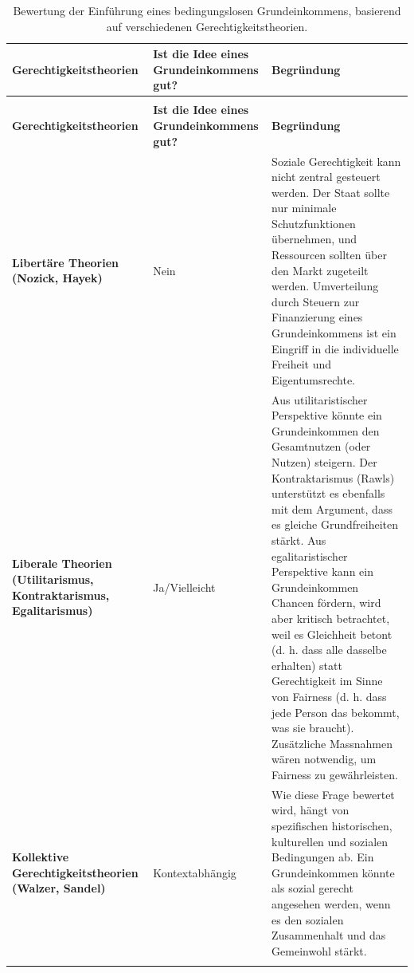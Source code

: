 \documentclass[
  nswissgerman,
  a4paper,
  DIV=11,
  numbers=noendperiod,
  oneside,
  openany]{scrreprt}
\begin{document}
\begin{longtable}[t]{>{\raggedright\arraybackslash}p{3.2cm}>{\raggedright\arraybackslash}p{2.5cm}>{\raggedright\arraybackslash}p{9.3cm}}

\caption{\label{tbl-basic-income-justice}Bewertung der Einführung eines
bedingungslosen Grundeinkommens, basierend auf verschiedenen
Gerechtigkeitstheorien.}

\tabularnewline

\toprule
\textbf{Gerechtigkeitstheorien} & \textbf{Ist die Idee eines Grundeinkommens gut?} & \textbf{Begründung}\\
\midrule
\endfirsthead
\multicolumn{3}{@{}l}{\textit{(continued)}}\\
\toprule
\textbf{Gerechtigkeitstheorien} & \textbf{Ist die Idee eines Grundeinkommens gut?} & \textbf{Begründung}\\
\midrule
\endhead

\endfoot
\bottomrule
\endlastfoot
\textbf{Libertäre Theorien (Nozick, Hayek)} & Nein & Soziale Gerechtigkeit kann nicht zentral gesteuert werden. Der Staat sollte nur minimale Schutzfunktionen übernehmen, und Ressourcen sollten über den Markt zugeteilt werden. Umverteilung durch Steuern zur Finanzierung eines Grundeinkommens ist ein Eingriff in die individuelle Freiheit und Eigentumsrechte.\\
\textbf{Liberale Theorien (Utilitarismus, Kontraktarismus, Egalitarismus)} & Ja/Vielleicht & Aus utilitaristischer Perspektive könnte ein Grundeinkommen den Gesamtnutzen (oder Nutzen) steigern. Der Kontraktarismus (Rawls) unterstützt es ebenfalls mit dem Argument, dass es gleiche Grundfreiheiten stärkt. Aus egalitaristischer Perspektive kann ein Grundeinkommen Chancen fördern, wird aber kritisch betrachtet, weil es Gleichheit betont (d. h. dass alle dasselbe erhalten) statt Gerechtigkeit im Sinne von Fairness (d. h. dass jede Person das bekommt, was sie braucht). Zusätzliche Massnahmen wären notwendig, um Fairness zu gewährleisten.\\
\textbf{Kollektive Gerechtigkeitstheorien (Walzer, Sandel)} & Kontextabhängig & Wie diese Frage bewertet wird, hängt von spezifischen historischen, kulturellen und sozialen Bedingungen ab. Ein Grundeinkommen könnte als sozial gerecht angesehen werden, wenn es den sozialen Zusammenhalt und das Gemeinwohl stärkt.\\*

\end{longtable}

\endgroup{}
\end{document}
